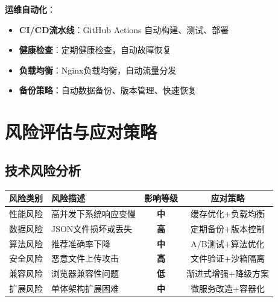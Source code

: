 \documentclass[12pt,a4paper]{article}
\begin{document}
\textbf{运维自动化}：
\begin{itemize}
    \item \textbf{CI/CD流水线}：GitHub Actions 自动构建、测试、部署
    \item \textbf{健康检查}：定期健康检查，自动故障恢复
    \item \textbf{负载均衡}：Nginx负载均衡，自动流量分发
    \item \textbf{备份策略}：自动数据备份、版本管理、快速恢复
\end{itemize}

\section{风险评估与应对策略}

\subsection{技术风险分析}

\begin{table}[H]
\centering
\begin{tcolorbox}[
    colback=light,
    colframe=danger,
    title={\textbf{技术风险评估与应对策略}},
    coltitle=white,
    colbacktitle=danger,
    fonttitle=\bfseries,
    rounded corners=5pt,
    width=0.95\textwidth
]
\begin{tabular}{llcc}
\toprule
\rowcolor{danger!20}
\textbf{风险类别} & \textbf{风险描述} & \textbf{影响等级} & \textbf{应对策略} \\
\midrule
性能风险 & 高并发下系统响应变慢 & \textcolor{warning}{\textbf{中}} & 缓存优化+负载均衡 \\
\rowcolor{light}
数据风险 & JSON文件损坏或丢失 & \textcolor{danger}{\textbf{高}} & 定期备份+版本控制 \\
算法风险 & 推荐准确率下降 & \textcolor{warning}{\textbf{中}} & A/B测试+算法优化 \\
\rowcolor{light}
安全风险 & 恶意文件上传攻击 & \textcolor{danger}{\textbf{高}} & 文件验证+沙箱隔离 \\
兼容风险 & 浏览器兼容性问题 & \textcolor{success}{\textbf{低}} & 渐进式增强+降级方案 \\
\rowcolor{light}
扩展风险 & 单体架构扩展困难 & \textcolor{warning}{\textbf{中}} & 微服务改造+容器化 \\
\bottomrule
\end{tabular}
\end{tcolorbox}
\end{table}
\end{document}
